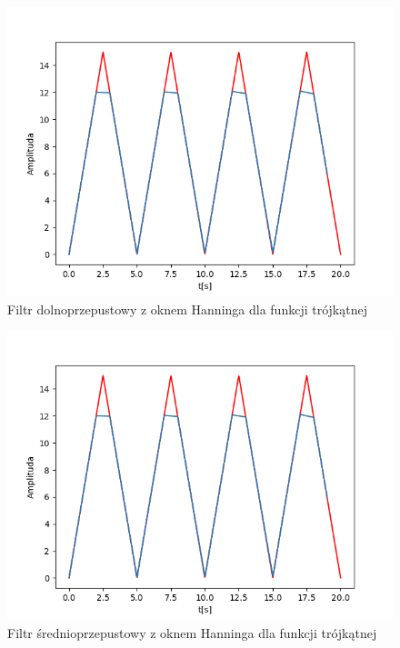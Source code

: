 \documentclass[12pt]{article}
\begin{document}
\begin{figure}[H]
\centering
\includegraphics[scale=0.6]{8trojkatInterp1rzedu20.png}
\caption{Filtr dolnoprzepustowy z oknem Hanninga dla funkcji trójkątnej}
\end{figure}

\begin{figure}[H]
\centering
\includegraphics[scale=0.6]{8trojkatInterp1rzedu20.png}
\caption{Filtr średnioprzepustowy z oknem Hanninga dla funkcji trójkątnej}
\end{figure}
\end{document}

